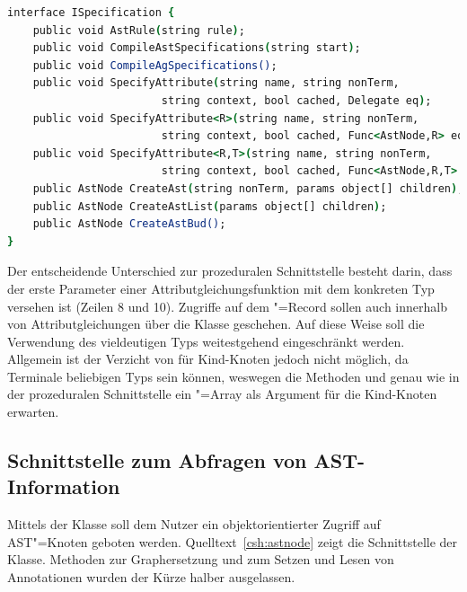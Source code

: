 \begin{lstlisting}[language=csh, caption={Schnittstelle der Klasse \csh{Racr.Specification}}, label=csh:spec]
interface ISpecification {
	public void AstRule(string rule);
	public void CompileAstSpecifications(string start);
	public void CompileAgSpecifications();
	public void SpecifyAttribute(string name, string nonTerm,
						string context, bool cached, Delegate eq);
	public void SpecifyAttribute<R>(string name, string nonTerm,
						string context, bool cached, Func<AstNode,R> eq);
	public void SpecifyAttribute<R,T>(string name, string nonTerm,
						string context, bool cached, Func<AstNode,R,T> eq);
	public AstNode CreateAst(string nonTerm, params object[] children);
	public AstNode CreateAstList(params object[] children);
	public AstNode CreateAstBud();
}
\end{lstlisting}

Der entscheidende Unterschied zur prozeduralen Schnittstelle besteht darin, dass der erste Parameter einer Attributgleichungsfunktion mit dem konkreten Typ  versehen ist (Zeilen 8 und 10). Zugriffe auf dem "=Record sollen auch innerhalb von Attributgleichungen über die Klasse  geschehen. Auf diese Weise soll die Verwendung des vieldeutigen Typs  weitestgehend eingeschränkt werden. Allgemein ist der Verzicht von  für Kind-Knoten jedoch nicht möglich, da Terminale beliebigen Typs sein können, weswegen die Methoden  und  genau wie in der prozeduralen Schnittstelle ein "=Array als Argument für die Kind-Knoten erwarten.

\subsection{Schnittstelle zum Abfragen von AST-Information}\label{ast-knoten}

Mittels der Klasse  soll dem Nutzer ein objektorientierter Zugriff auf AST"=Knoten geboten werden. Quelltext~\ref{csh:astnode} zeigt die Schnittstelle der Klasse. Methoden zur Graphersetzung und zum Setzen und Lesen von Annotationen wurden der Kürze halber ausgelassen.

